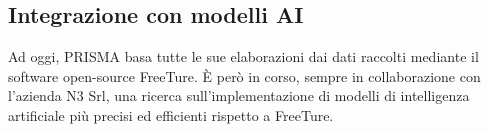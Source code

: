\subsection{Integrazione con modelli AI}

Ad oggi, PRISMA basa tutte le sue elaborazioni dai dati raccolti mediante il software open-source FreeTure. È però in corso, sempre in collaborazione con l'azienda N3 Srl, una ricerca sull'implementazione di modelli di intelligenza artificiale più precisi ed efficienti rispetto a FreeTure. 